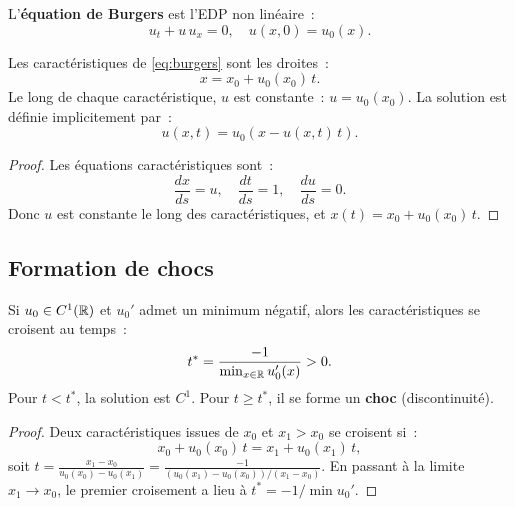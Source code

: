 \begin{definition}
L'\textbf{\'equation de Burgers} est l'EDP non lin\'eaire~:
\begin{equation}\label{eq:burgers}
    u_t + u\, u_x = 0, \quad u(x,0) = u_0(x).
\end{equation}
\end{definition}

\begin{theoreme}
Les caract\'eristiques de \eqref{eq:burgers} sont les droites~:
\[
    x = x_0 + u_0(x_0)\, t.
\]
Le long de chaque caract\'eristique, $u$ est constante~: $u = u_0(x_0)$.
La solution est d\'efinie implicitement par~:
\begin{equation}\label{eq:burgers_implicite}
    u(x,t) = u_0(x - u(x,t)\, t).
\end{equation}
\end{theoreme}

\begin{proof}
Les \'equations caract\'eristiques sont~:
\[
    \frac{dx}{ds} = u, \quad \frac{dt}{ds} = 1, \quad \frac{du}{ds} = 0.
\]
Donc $u$ est constante le long des caract\'eristiques, et $x(t) = x_0 + u_0(x_0)\, t$.
\end{proof}

\subsection{Formation de chocs}

\begin{theoreme}
Si $u_0 \in C^1(\mathbb{R})$ et $u_0'$ admet un minimum n\'egatif, alors les
caract\'eristiques se croisent au temps~:
\begin{equation}\label{eq:temps_choc}
    t^* = \frac{-1}{\min_{x \in \mathbb{R}} u_0'(x)} > 0.
\end{equation}
Pour $t < t^*$, la solution est $C^1$. Pour $t \geq t^*$, il se forme
un \textbf{choc} (discontinuit\'e).
\end{theoreme}

\begin{proof}
Deux caract\'eristiques issues de $x_0$ et $x_1 > x_0$ se croisent si~:
\[
    x_0 + u_0(x_0)\, t = x_1 + u_0(x_1)\, t,
\]
soit $t = \frac{x_1 - x_0}{u_0(x_0) - u_0(x_1)} = \frac{-1}{(u_0(x_1)-u_0(x_0))/(x_1-x_0)}$.
En passant \`a la limite $x_1 \to x_0$, le premier croisement a lieu \`a
$t^* = -1/\min u_0'$.
\end{proof}

